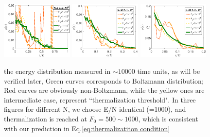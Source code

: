 \documentclass[aps,preprintnumbers,onecolumn,amsmath,amssymb,floatfix,pra]{revtex4-1}
\begin{document}
\begin{figure}[h]
\centering
\includegraphics[width=0.32\textwidth]{ZhiyuPictures/N=5_energydistribution_500_400_Font16.eps} 
\includegraphics[width=0.32\textwidth]{ZhiyuPictures/N=10_energydistribution_500_400_Font16.eps}
\includegraphics[width=0.32\textwidth]{ZhiyuPictures/N=20_energydistribution_500_400_Font16.eps}
\caption{the energy distribution measured in $\sim 10000$ time units, as will be verified later, Green curves corresponds to Boltzmann distribution; Red curves are obviously non-Boltzmann, while the yellow ones are intermediate case, represent ``thermalization threshold". In three figures for different N, we choose E/N identical (=1000), and thermalization is reached at $F_0=500\sim1000$, which is consistent with our prediction in Eq.\ref{eq:thermalizatiton condition}}
\label{fig:thermalization5}

\end{figure}

\end{document}
